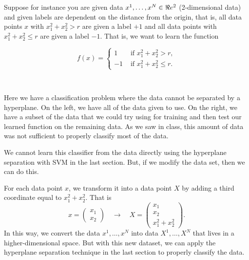 Suppose for instance you are given data $x^1, \dots, x^N \in \Re e^2$ (2-dimensional data) and given labels are dependent on the distance from the origin, that is,  all data points $x$ with  $x_1^2 + x_2^2 > r$ are given a label $+1$ and all data points with $x_1^2 + x_2^2 \leq r$ are given a label $-1$.   That is, we want to learn the function 

\begin{equation}
f(x) = \begin{cases}
1 & \text{ if } x_1^2 + x_2^2 >  r,\\
-1 & \text{ if } x_1^2 + x_2^2 \leq r.
\end{cases}
\end{equation}

\begin{example}{}{}
\begin{center}
 \ \ 
\end{center}
Here we have a classification problem where the data cannot be separated by a hyperplane.  On the left, we have all of the data given to use.  On the right, we have a subset of the data that we could try using for training and then test our learned function on the remaining data.  As we saw in class, this amount of data was not sufficient to properly classify most of the data.
\end{example}

We cannot learn this classifier from the data directly using the hyperplane separation with SVM in the last section.  But, if we modify the data set, then we can do this.  

For each data point $x$, we transform it into a data point $X$ by adding a third coordinate equal to $x_1^2 + x_2^2$.  That is 
\begin{equation}
x = \begin{pmatrix} x_1 \\ x_2 \end{pmatrix} \quad \rightarrow \quad X = \begin{pmatrix} x_1 \\ x_2 \\ x_1^2 + x_2^2 \end{pmatrix}.
\end{equation}
In this way, we convert the data $x^1, \dots, x^N$ into data $X^1, \dots, X^N$ that lives in a higher-dimensional space.  But with this new dataset, we can apply the hyperplane separation technique in the last section to properly classify the data.

